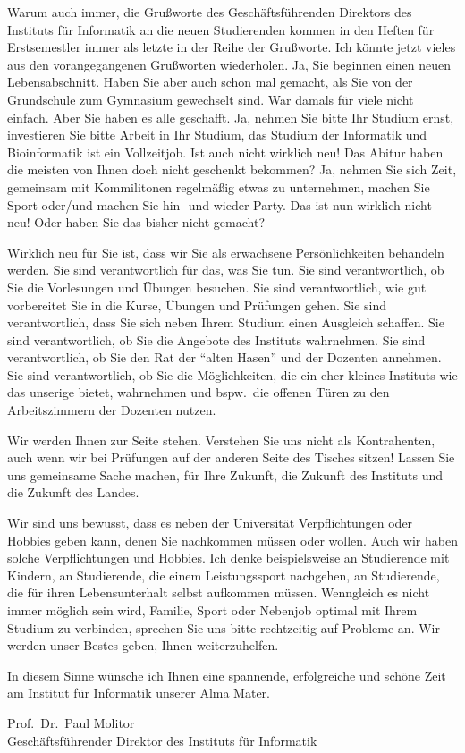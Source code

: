 Warum auch immer, die Grußworte des Geschäftsführenden Direktors des Instituts
für Informatik an die neuen Studierenden kommen in den Heften für Erstsemestler
immer als letzte in der Reihe der Grußworte. Ich könnte jetzt vieles aus den
vorangegangenen Grußworten wiederholen. Ja, Sie beginnen einen neuen
Lebensabschnitt. Haben Sie aber auch schon mal  gemacht, als Sie von der
Grundschule zum Gymnasium gewechselt sind. War damals für viele nicht einfach.
Aber Sie haben es alle geschafft. Ja, nehmen Sie bitte Ihr Studium ernst,
investieren Sie bitte Arbeit in Ihr Studium, das Studium der Informatik und
Bioinformatik ist ein Vollzeitjob. Ist auch nicht wirklich neu! Das Abitur haben
die meisten von Ihnen doch nicht geschenkt bekommen? Ja, nehmen Sie sich Zeit,
gemeinsam mit Kommilitonen regelmäßig etwas zu unternehmen, machen Sie Sport
oder/und machen Sie hin- und wieder Party. Das ist nun wirklich nicht neu! Oder
haben Sie das bisher nicht gemacht?

Wirklich neu für Sie ist, dass wir Sie als erwachsene Persönlichkeiten behandeln
werden. Sie sind verantwortlich für das, was Sie tun. Sie sind verantwortlich,
ob Sie die Vorlesungen und Übungen besuchen. Sie sind verantwortlich, wie gut
vorbereitet Sie in die Kurse, Übungen und Prüfungen gehen. Sie sind
verantwortlich, dass Sie sich neben Ihrem Studium einen Ausgleich schaffen. Sie
sind verantwortlich, ob Sie die Angebote des Instituts wahrnehmen. Sie sind
verantwortlich, ob Sie den Rat der \enquote{alten Hasen} und der Dozenten annehmen. Sie
sind verantwortlich, ob Sie die Möglichkeiten, die ein eher kleines Instituts
wie das unserige bietet, wahrnehmen und bspw.\ die offenen Türen zu den
Arbeitszimmern der Dozenten nutzen.

Wir werden Ihnen zur Seite stehen. Verstehen Sie uns nicht als Kontrahenten,
auch wenn wir bei Prüfungen auf der anderen Seite des Tisches sitzen! Lassen Sie
uns gemeinsame Sache machen, für Ihre Zukunft, die Zukunft des Instituts und die
Zukunft des Landes.

Wir sind uns bewusst, dass es neben der Universität Verpflichtungen oder Hobbies
geben kann, denen Sie nachkommen müssen oder wollen. Auch wir haben solche
Verpflichtungen und Hobbies. Ich denke beispielsweise an Studierende mit
Kindern, an Studierende, die einem Leistungssport nachgehen, an Studierende, die
für  ihren Lebensunterhalt selbst aufkommen müssen. Wenngleich es nicht immer
möglich sein wird, Familie, Sport oder Nebenjob optimal mit Ihrem Studium zu
verbinden, sprechen Sie uns bitte rechtzeitig auf Probleme an. Wir werden unser
Bestes geben, Ihnen weiterzuhelfen.

In diesem Sinne wünsche ich Ihnen eine spannende, erfolgreiche und schöne Zeit
am Institut für Informatik unserer Alma Mater.

Prof.\ Dr.\ Paul Molitor \\
Geschäftsführender Direktor des Instituts für Informatik
